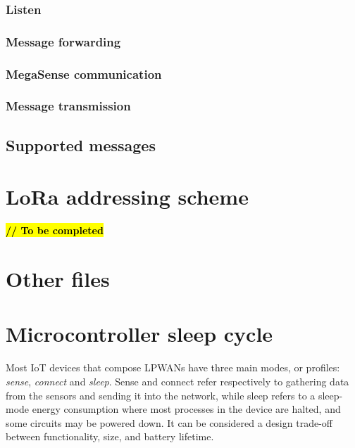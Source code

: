 			\subsubsection{Listen}
			
			\subsubsection{Message forwarding}
			
			\subsubsection{MegaSense communication}
			
			\subsubsection{Message transmission}
			
		\subsection{Supported messages}
		
	\section{LoRa addressing scheme}\label{subsec:lora_addressing}

		\textbf{\textcolor{red}{\hl{// To be completed}}}
		
		
		
		
	\section{Other files}
	
		
	\section{Microcontroller sleep cycle}\label{sec:sleep}
	
		Most IoT devices that compose LPWANs have three main modes, or profiles: \textit{sense}, \textit{connect} and \textit{sleep}.
		Sense and connect refer respectively to gathering data from the sensors and sending it into the network, while sleep refers to a sleep-mode energy consumption where most processes in the device are halted, and some circuits may be powered down.
		It can be considered a design trade-off between functionality, size, and battery lifetime.
		
